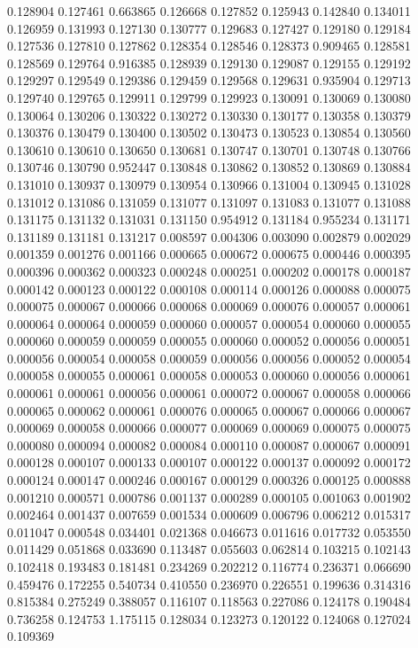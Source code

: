 0.128904
0.127461
0.663865
0.126668
0.127852
0.125943
0.142840
0.134011
0.126959
0.131993
0.127130
0.130777
0.129683
0.127427
0.129180
0.129184
0.127536
0.127810
0.127862
0.128354
0.128546
0.128373
0.909465
0.128581
0.128569
0.129764
0.916385
0.128939
0.129130
0.129087
0.129155
0.129192
0.129297
0.129549
0.129386
0.129459
0.129568
0.129631
0.935904
0.129713
0.129740
0.129765
0.129911
0.129799
0.129923
0.130091
0.130069
0.130080
0.130064
0.130206
0.130322
0.130272
0.130330
0.130177
0.130358
0.130379
0.130376
0.130479
0.130400
0.130502
0.130473
0.130523
0.130854
0.130560
0.130610
0.130610
0.130650
0.130681
0.130747
0.130701
0.130748
0.130766
0.130746
0.130790
0.952447
0.130848
0.130862
0.130852
0.130869
0.130884
0.131010
0.130937
0.130979
0.130954
0.130966
0.131004
0.130945
0.131028
0.131012
0.131086
0.131059
0.131077
0.131097
0.131083
0.131077
0.131088
0.131175
0.131132
0.131031
0.131150
0.954912
0.131184
0.955234
0.131171
0.131189
0.131181
0.131217
0.008597
0.004306
0.003090
0.002879
0.002029
0.001359
0.001276
0.001166
0.000665
0.000672
0.000675
0.000446
0.000395
0.000396
0.000362
0.000323
0.000248
0.000251
0.000202
0.000178
0.000187
0.000142
0.000123
0.000122
0.000108
0.000114
0.000126
0.000088
0.000075
0.000075
0.000067
0.000066
0.000068
0.000069
0.000076
0.000057
0.000061
0.000064
0.000064
0.000059
0.000060
0.000057
0.000054
0.000060
0.000055
0.000060
0.000059
0.000059
0.000055
0.000060
0.000052
0.000056
0.000051
0.000056
0.000054
0.000058
0.000059
0.000056
0.000056
0.000052
0.000054
0.000058
0.000055
0.000061
0.000058
0.000053
0.000060
0.000056
0.000061
0.000061
0.000061
0.000056
0.000061
0.000072
0.000067
0.000058
0.000066
0.000065
0.000062
0.000061
0.000076
0.000065
0.000067
0.000066
0.000067
0.000069
0.000058
0.000066
0.000077
0.000069
0.000069
0.000075
0.000075
0.000080
0.000094
0.000082
0.000084
0.000110
0.000087
0.000067
0.000091
0.000128
0.000107
0.000133
0.000107
0.000122
0.000137
0.000092
0.000172
0.000124
0.000147
0.000246
0.000167
0.000129
0.000326
0.000125
0.000888
0.001210
0.000571
0.000786
0.001137
0.000289
0.000105
0.001063
0.001902
0.002464
0.001437
0.007659
0.001534
0.000609
0.006796
0.006212
0.015317
0.011047
0.000548
0.034401
0.021368
0.046673
0.011616
0.017732
0.053550
0.011429
0.051868
0.033690
0.113487
0.055603
0.062814
0.103215
0.102143
0.102418
0.193483
0.181481
0.234269
0.202212
0.116774
0.236371
0.066690
0.459476
0.172255
0.540734
0.410550
0.236970
0.226551
0.199636
0.314316
0.815384
0.275249
0.388057
0.116107
0.118563
0.227086
0.124178
0.190484
0.736258
0.124753
1.175115
0.128034
0.123273
0.120122
0.124068
0.127024
0.109369
